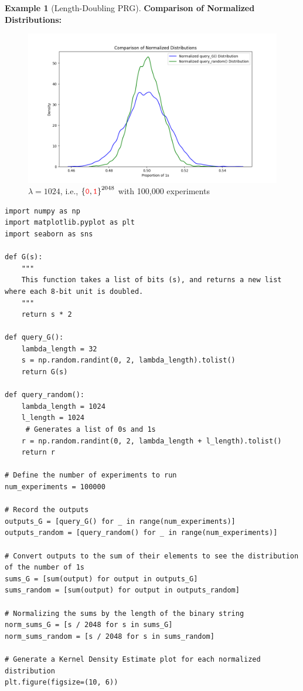 \documentclass[12pt,openany]{book}
\theoremstyle{definition}
\newtheorem{example}{Example}[chapter]
\newcommand{\ie}{\textnormal{i.e.}}
\newcommand{\zero}{\textcolor{red}{\texttt{0}}}
\newcommand{\one}{\textcolor{red}{\texttt{1}}}
\newcommand{\binaryfield}{\set{\zero,\one}}
\begin{document}
\begin{example}[Length-Doubling PRG]
	\newpage
	\textbf{Comparison of Normalized Distributions:}
	\begin{figure}[h!]\centering
		\includegraphics[width=\textwidth, height=.45\textheight]{query_1024.png}
		\caption{$\lambda=1024$, \ie, $\binaryfield^{2048}$ with 100,000 experiments}
	\end{figure}
	\begin{lstlisting}[style=sage]
import numpy as np
import matplotlib.pyplot as plt
import seaborn as sns

def G(s):
	"""
	This function takes a list of bits (s), and returns a new list where each 8-bit unit is doubled.
	"""
	return s * 2

def query_G():
	lambda_length = 32
	s = np.random.randint(0, 2, lambda_length).tolist()
	return G(s)

def query_random():
	lambda_length = 1024
	l_length = 1024
	 # Generates a list of 0s and 1s
	r = np.random.randint(0, 2, lambda_length + l_length).tolist()
	return r

# Define the number of experiments to run
num_experiments = 100000

# Record the outputs
outputs_G = [query_G() for _ in range(num_experiments)]
outputs_random = [query_random() for _ in range(num_experiments)]

# Convert outputs to the sum of their elements to see the distribution of the number of 1s
sums_G = [sum(output) for output in outputs_G]
sums_random = [sum(output) for output in outputs_random]

# Normalizing the sums by the length of the binary string
norm_sums_G = [s / 2048 for s in sums_G]
norm_sums_random = [s / 2048 for s in sums_random]

# Generate a Kernel Density Estimate plot for each normalized distribution
plt.figure(figsize=(10, 6))


\end{lstlisting}
\end{example}
\end{document}
